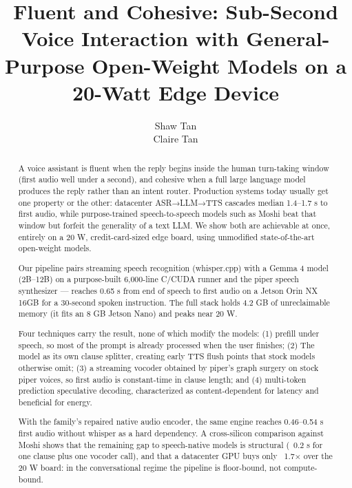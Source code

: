 \documentclass{article}
\title{Fluent and Cohesive: Sub-Second Voice Interaction with General-Purpose Open-Weight Models on a 20-Watt Edge Device}
\author{ Shaw Tan \\
	\And
	Claire Tan \\
}
\begin{document}
\maketitle

\begin{abstract}
A voice assistant is fluent when the reply begins inside the human turn-taking window (first audio well under a second), and cohesive when a full large language model produces the reply rather than an intent router. Production systems today usually get one property or the other: datacenter ASR→LLM→TTS cascades median 1.4–1.7 s to first audio, while purpose-trained speech-to-speech models such as Moshi beat that window but forfeit the generality of a text LLM. We show both are achievable at once, entirely on a 20 W, credit-card-sized edge board, using unmodified state-of-the-art open-weight models.

Our pipeline pairs streaming speech recognition (whisper.cpp) with a Gemma 4 model (2B–12B) on a purpose-built 6,000-line C/CUDA runner and the piper speech synthesizer — reaches 0.65 s from end of speech to first audio on a Jetson Orin NX 16GB for a 30-second spoken instruction. The full stack holds 4.2 GB of unreclaimable memory (it fits an 8 GB Jetson Nano) and peaks near 20 W.

Four techniques carry the result, none of which modify the models: 
(1) prefill under speech, so most of the prompt is already processed when the user finishes; 
(2)  The model as its own clause splitter, creating early TTS flush points that stock models otherwise omit; 
(3) a streaming vocoder obtained by piper's graph surgery on stock piper voices, so first audio is constant-time in clause length; and 
(4) multi-token prediction speculative decoding, characterized as content-dependent for latency and beneficial for energy. 

With the family’s repaired native audio encoder, the same engine reaches 0.46–0.54 s first audio without whisper as a hard dependency. A cross-silicon comparison against Moshi shows that the remaining gap to speech-native models is structural (~0.2 s for one clause plus one vocoder call), and that a datacenter GPU buys only ~1.7× over the 20 W board: in the conversational regime the pipeline is floor-bound, not compute-bound.
\end{abstract}

\end{document}
